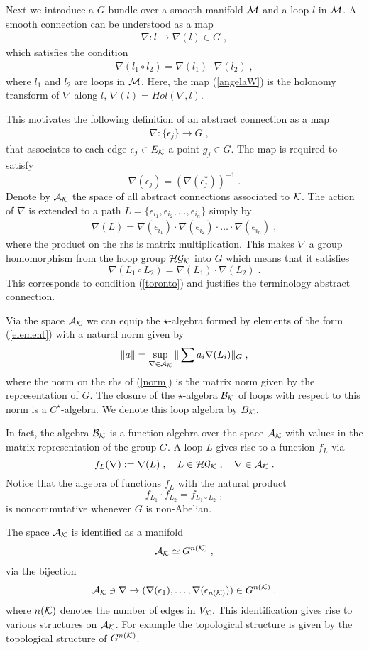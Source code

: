 \documentclass[12pt]{article}
\newcommand{\ba}{\begin{eqnarray}}
\newcommand{\ea}{\end{eqnarray}}
\def\e{\epsilon}
\def\ca{{\cal A}}
\def\cb{{\cal B}}
\def\cg{{\cal G}}
\def\ch{{\cal H}}
\def\ck{{\cal K}}
\def\cm{{\cal M}}
\begin{document}
Next we introduce a $G$-bundle over a smooth manifold $\cm$ and a loop $l$ in $\cm$. A smooth connection can be understood as a map
\ba 
\nabla:l\rightarrow \nabla(l)\in G\;,
\label{angelaW}
\ea
which satisfies the condition
\ba 
\nabla(l_1\circ l_2)= \nabla(l_1)\cdot \nabla(l_2)\;,
\label{toronto}
\ea
where $l_1$ and $l_2$ are loops in $\cm$. Here, the map (\ref{angelaW}) is the holonomy transform of $\nabla$ along $l$,
$
\nabla(l)=Hol(\nabla,l)
$. 

This motivates the following definition of an abstract connection as a map
\ba
\nabla:\{\e_j\}\rightarrow G\;,\quad 
\label{identification2}
\ea
that associates to each edge $\e_j\in E_\ck$ a point $g_j\in G$. The map is required to satisfy
\[
\nabla(\e_j)=(\nabla(\e_j^\ast))^{-1}\;.
\]
Denote by $\ca_\ck$ the space of all abstract connections associated to $\ck$. The action of $\nabla$ is extended to a path $L=\{\e_{i_1},\e_{i_2},\ldots,\e_{i_n}\}$ simply by
\ba
\nabla(L)=\nabla(\e_{i_1})\cdot\nabla(\e_{i_2})\cdot\ldots\cdot\nabla(\e_{i_n})\;,
\label{actionon}
\ea
where the product on the rhs is matrix multiplication. This makes $\nabla$ a group homomorphism from the hoop group $\ch\cg_\ck$ into $G$ which means that it satisfies
\[
\nabla(L_1\circ L_2) = \nabla(L_1)\cdot\nabla(L_2)\;.
\]
This corresponds to condition (\ref{toronto}) and justifies the terminology abstract connection.

Via the space $\ca_\ck$ we can equip the $\star$-algebra formed by elements of the form (\ref{element}) with a natural norm given by
\ba
\| a \|= \sup_{\nabla\in\ca_\ck}\|\sum a_i \nabla(L_i)  \|_G\;,
\label{norm}
\ea
where the norm on the rhs of (\ref{norm}) is the matrix norm given by the representation of $G$. The closure of the $\star$-algebra $\cb_\ck$ of loops with respect to this norm is a $C^\star$-algebra. We denote this loop algebra by $B_\ck$.

In fact, the algebra $\cb_\ck$ is a function algebra over the space $\ca_\ck$ with values in the matrix representation of the group $G$. A loop $L$ gives rise to a function $f_L$ via
\[
f_L(\nabla):= \nabla(L)\;,\quad L\in\ch\cg_\ck\;,\quad \nabla\in\ca_\ck\;.
\]
Notice that the algebra of functions $f_L$ with the natural product
\[
f_{L_1}\cdot f_{L_2}= f_{L_1\circ L_2}\;,
\] 
is noncommutative whenever $G$ is non-Abelian.


The space $\ca_\ck$ is identified as a manifold
\ba
\ca_\ck\simeq G^{n(\ck)}\;,
\label{identification1}
\nonumber
\ea
via the bijection
\ba
\ca_\ck\ni\nabla\rightarrow (\nabla(\e_1),\ldots,\nabla(\e_{n(\ck)}))\in G^{n(\ck)} \;.
\ea
where $n(\ck)$ denotes the number of edges in $V_\ck$. This identification gives rise to various structures on $\ca_\ck$. For example the topological structure is given by the topological structure of $G^{n(\ck)}$. 
\end{document}
